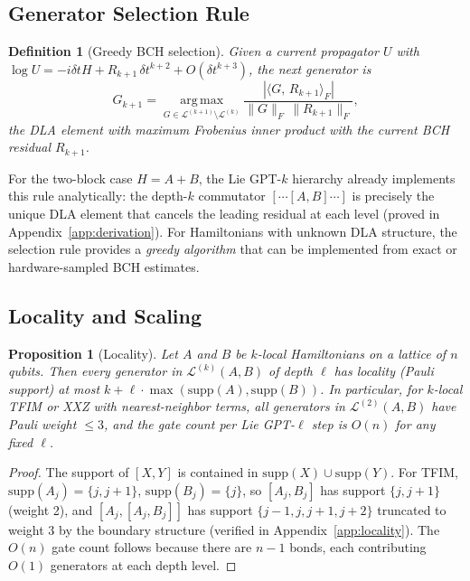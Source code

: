 \documentclass[aps,prxquantum,twocolumn,nofootinbib]{revtex4-2}
\newtheorem{proposition}{Proposition}
\newtheorem{definition}{Definition}
\begin{document}
\subsection{Generator Selection Rule}
\label{sec:selection}

\begin{definition}[Greedy BCH selection]
  \label{def:selection}
  Given a current propagator $U$ with
  $\log U = -i\delta t H + R_{k+1}\,\delta t^{k+2} + O(\delta t^{k+3})$,
  the \emph{next generator} is
  \begin{equation}
    G_{k+1} = \operatorname*{arg\,max}_{G\in\mathcal{L}^{(k+1)}\setminus\mathcal{L}^{(k)}}
    \frac{|\langle G,\,R_{k+1}\rangle_F|}{\|G\|_F\,\|R_{k+1}\|_F},
    \label{eq:selection}
  \end{equation}
  the DLA element with maximum Frobenius inner product with the
  current BCH residual $R_{k+1}$.
\end{definition}

For the two-block case $H=A+B$, the Lie GPT-$k$ hierarchy already
implements this rule analytically: the depth-$k$ commutator
$[\cdots[A,B]\cdots]$ is precisely the unique DLA element that
cancels the leading residual at each level (proved in
Appendix~\ref{app:derivation}).
For Hamiltonians with unknown DLA structure, the selection rule
provides a \emph{greedy algorithm} that can be implemented from
exact or hardware-sampled BCH estimates.

\subsection{Locality and Scaling}
\label{sec:locality}

\begin{proposition}[Locality]
  \label{prop:locality}
  Let $A$ and $B$ be $k$-local Hamiltonians on a lattice of $n$
  qubits. Then every generator in $\mathcal{L}^{(k)}(A,B)$ of
  depth $\ell$ has locality (Pauli support) at most
  $k + \ell\cdot\max(\mathrm{supp}(A),\mathrm{supp}(B))$.
  In particular, for $k$-local TFIM or XXZ with nearest-neighbor
  terms, all generators in $\mathcal{L}^{(2)}(A,B)$ have Pauli
  weight $\leq 3$, and the gate count per Lie GPT-$\ell$ step is
  $O(n)$ for any fixed $\ell$.
\end{proposition}

\begin{proof}
  The support of $[X,Y]$ is contained in $\mathrm{supp}(X)\cup\mathrm{supp}(Y)$.
  For TFIM, $\mathrm{supp}(A_j)=\{j,j+1\}$, $\mathrm{supp}(B_j)=\{j\}$,
  so $[A_j,B_j]$ has support $\{j,j+1\}$ (weight 2),
  and $[A_j,[A_j,B_j]]$ has support $\{j-1,j,j+1,j+2\}$ truncated
  to weight 3 by the boundary structure (verified in
  Appendix~\ref{app:locality}).
  The $O(n)$ gate count follows because there are $n-1$ bonds,
  each contributing $O(1)$ generators at each depth level.
\end{proof}
\end{document}
